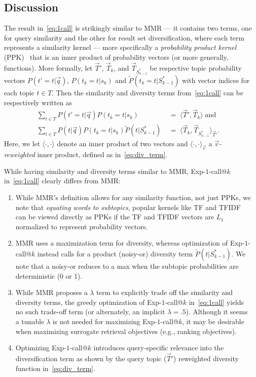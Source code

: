\subsection{Discussion}

The result in~\eqref{eq:1call} is strikingly similar to MMR --- it
contains two terms, one for query similarity and the other for result
set diversification, where each term represents a similarity kernel
--- more specifically a \emph{probability product kernel}
(PPK)~\cite{prodprobkernel} that is an inner product of probability
vectors (or more generally, functions).  More formally, let
$\vec{T}'$, $\vec{T}_k$, and $\vec{T}_{S_{k-1}^*}$ be respective topic
probability vectors $P(t'=t|\vec{q})$, $P(t_k=t|s_k)$ and
$\tilde{P}(t_k=t | S_{k-1}^*)$ with vector indices for each topic $t
\in T$.  Then the similarity and diversity terms from~\eqref{eq:1call}
can be respectively written as
\begin{align}
\sum_{t \in T} P(t'=t|\vec{q}) P(t_k=t|s_{k}) & \; = \; \langle \vec{T}',\vec{T}_k \rangle \label{eq:sim_term} \; \mbox{and}\\
\sum_{t \in T} P(t|\vec{q}) P(t_k=t|s_k) \tilde{P}(t | S_{k-1}^*) & \; = \; \langle \vec{T}_k, \vec{T}_{S_{k-1}^*} \rangle_{\vec{T}'}. \label{eq:div_term}
\end{align}
Here, we let $\langle \cdot,\cdot \rangle$ denote an inner product of
two vectors and $\langle \cdot,\cdot \rangle_\vec{v}$ a
\emph{$\vec{v}$-reweighted} inner product, defined as
in~\eqref{eq:div_term}.

While having similarity and diversity terms similar to MMR,
Exp-$1$-call@$k$ in~\eqref{eq:1call} clearly differs from MMR:
\begin{enumerate}
\item While MMR's definition allows for any similarity function, not
just PPKs, we note that \emph{equating words to subtopics}, popular
kernels like TF and TFIDF~\cite{salton83Introduction} can be viewed
directly as PPKs if the TF and TFIDF vectors are $L_1$ normalized to
represent probability vectors.
\item MMR uses a maximization term for
diversity, whereas optimization of Exp-$1$-call@$k$ instead calls for
a product (noisy-or) diversity term $\tilde{P}(t | S_{k-1}^*)$.
We note that a noisy-or reduces to a max when the subtopic
probabilities are deterministic (0 or 1).
\item While MMR proposes a $\lambda$ term to explicitly
trade off the similarity and diversity terms, the greedy optimization
of Exp-$1$-call@$k$ in~\eqref{eq:1call} yields no such trade-off term
(or alternately, an implicit $\lambda=.5$).  Although it seems a tunable
$\lambda$ is not needed for maximizing Exp-$1$-call@$k$, it may be
desirable when maximizing surrogate retrieval objectives (e.g., ranking
objectives).
\item Optimizing Exp-$1$-call@$k$ introduces query-specific relevance into
the diversification term as shown
by the query topic ($\vec{T}'$) reweighted
diversity function in~\eqref{eq:div_term}.
\end{enumerate}

